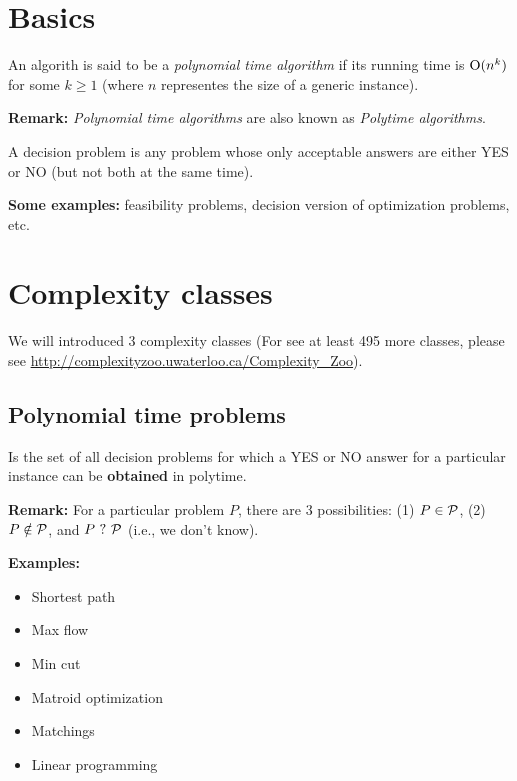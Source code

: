 \documentclass[../open-optimization/open-optimization.tex]{subfiles}
\begin{document}
\section{Basics}

\begin{definition}
An algorith is said to be a {\em polynomial time algorithm} if its running time is $\textup{O}(n^k)$ for some $k\geq 1$ (where $n$ representes the size of a generic instance).
\end{definition}

{\bf Remark:} {\em Polynomial time algorithms} are also known as  {\em Polytime algorithms}.

\begin{definition} 
A decision problem  is  any problem whose only acceptable answers are either YES or NO (but not both at the same time).
\end{definition}



{\bf Some examples:} feasibility problems, decision version of optimization problems, etc.

\section{Complexity classes}

We will introduced 3 complexity classes (For see at least 495 more classes, please see \url{http://complexityzoo.uwaterloo.ca/Complexity_Zoo}).

\subsection{Polynomial time problems} 
\begin{definition} 
Is the set of all decision problems for which a YES or NO answer for a  
particular instance can be {\bf obtained} in polytime.
\end{definition}

{\bf Remark:} For a particular problem $P$, there are 3 possibilities: (1) $P\in{\mathcal{P}}$, (2) $P\notin{\mathcal{P}}$, and $P\ \text{?}\ {\mathcal{P}}$ (i.e., we don't know). 

{\bf Examples:}

\begin{multicols}{2}
\begin{itemize}
	\item Shortest path
	\item Max flow
	\item Min cut
	\item Matroid optimization
	\item Matchings
	\item Linear programming
\end{itemize}
\end{multicols}
\end{document}

